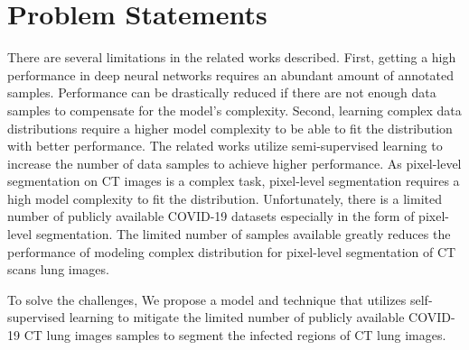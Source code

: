 \section{Problem Statements}
There are several limitations in the related works described. First, getting a high performance in deep neural networks requires an abundant amount of annotated samples. Performance can be drastically reduced if there are not enough data samples to compensate for the model’s complexity. Second, learning complex data distributions require a higher model complexity to be able to fit the distribution with better performance. The related works utilize semi-supervised learning to increase the number of data samples to achieve higher performance. As pixel-level segmentation on CT images is a complex task, pixel-level segmentation requires a high model complexity to fit the distribution. Unfortunately, there is a limited number of publicly available COVID-19 datasets especially in the form of pixel-level segmentation. The limited number of samples available greatly reduces the performance of modeling complex distribution for pixel-level segmentation of CT scans lung images. 

To solve the challenges, We propose a model and technique that utilizes self-supervised learning to mitigate the limited number of publicly available COVID-19 CT lung images samples to segment the infected regions of CT lung images. 

